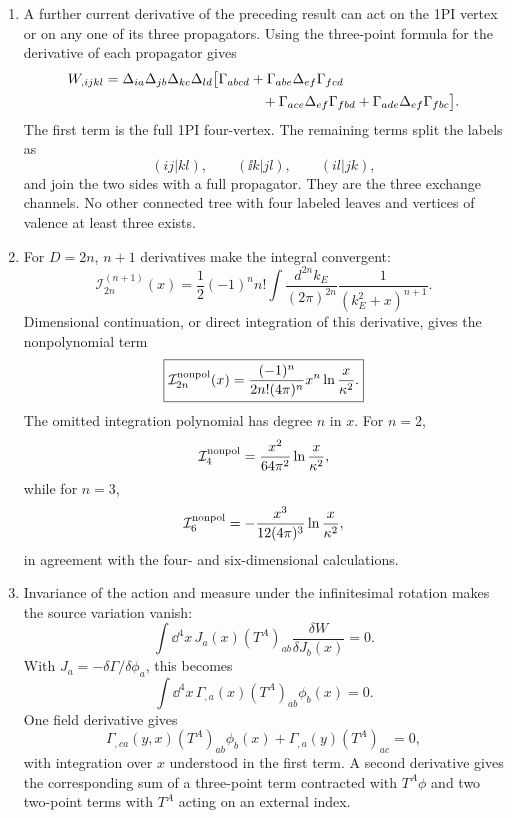\begin{enumerate}
  \begin{enumerate}
    \item[(a)]
    A further current derivative of the preceding result can act on the
    1PI vertex or on any one of its three propagators.  Using the
    three-point formula for the derivative of each propagator gives
    \[
      \begin{split}
      W_{,ijkl}={}&
        \Delta_{ia}\Delta_{jb}\Delta_{kc}\Delta_{ld}
        \bigl[
          \Gamma_{abcd}
          +\Gamma_{abe}\Delta_{ef}\Gamma_{fcd}\\
          &\hspace{35mm}
          +\Gamma_{ace}\Delta_{ef}\Gamma_{fbd}
          +\Gamma_{ade}\Delta_{ef}\Gamma_{fbc}
        \bigr].
      \end{split}
    \]
    The first term is the full 1PI four-vertex.  The remaining terms split
    the labels as
    \[
      (ij|kl),\qquad(\ii k|jl),\qquad(il|jk),
    \]
    and join the two sides with a full propagator.  They are the three
    exchange channels.  No other connected tree with four labeled leaves
    and vertices of valence at least three exists.
    \item[(b)]
    For \(D=2n\), \(n+1\) derivatives make the integral convergent:
    \[
      \mathcal I_{2n}^{(n+1)}(x)
        =\frac12(-1)^n n!
          \int\frac{d^{2n}k_E}{(2\pi)^{2n}}
          \frac1{(k_E^2+x)^{n+1}}.
    \]
    Dimensional continuation, or direct integration of this derivative,
    gives the nonpolynomial term
    \[
      \boxed{\mathcal I_{2n}^{\rm nonpol}(x)
        =\frac{(-1)^n}{2n!(4\pi)^n}
          x^n\ln\frac{x}{\kappa^2}.}
    \]
    The omitted integration polynomial has degree \(n\) in \(x\).
    For \(n=2\),
    \[
      \mathcal I_4^{\rm nonpol}
        =\frac{x^2}{64\pi^2}\ln\frac{x}{\kappa^2},
    \]
    while for \(n=3\),
    \[
      \mathcal I_6^{\rm nonpol}
        =-\frac{x^3}{12(4\pi)^3}\ln\frac{x}{\kappa^2},
    \]
    in agreement with the four- and six-dimensional calculations.
    \item[(c)]
    Invariance of the action and measure under the infinitesimal rotation
    makes the source variation vanish:
    \[
      \int \dd^4x\,J_a(x)(T^A)_{ab}
        \frac{\delta W}{\delta J_b(x)}=0.
    \]
    With \(J_a=-\delta\Gamma/\delta\phi_a\), this becomes
    \[
      \boxed{\int \dd^4x\,\Gamma_{,a}(x)
        (T^A)_{ab}\phi_b(x)=0.}
    \]
    One field derivative gives
    \[
      \Gamma_{,ca}(y,x)(T^A)_{ab}\phi_b(x)
        +\Gamma_{,a}(y)(T^A)_{ac}=0,
    \]
    with integration over \(x\) understood in the first term.  A second
    derivative gives the corresponding sum of a three-point term contracted
    with \(T^A\phi\) and two two-point terms with \(T^A\) acting on an
    external index.


\end{enumerate}
\end{enumerate}
